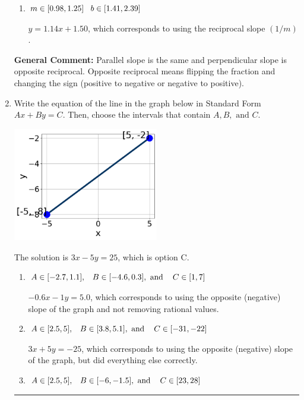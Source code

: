 \documentclass{extbook}[14pt]
\newcommand{\litem}[1]{\item #1

\rule{\textwidth}{0.4pt}}
\begin{document}
\begin{enumerate}
{\begin{enumerate}[label=\Alph*.]
 $y = 0.88x + 1.00$, which corresponds to correct slope and mis-distributing while simplifying to slope-intercept form.
\item \( m \in [0.98, 1.25] \hspace*{3mm} b \in [1.41, 2.39] \)

 $y = 1.14x + 1.50$, which corresponds to using the reciprocal slope $(1/m)$.
\end{enumerate}

\textbf{General Comment:} Parallel slope is the same and perpendicular slope is opposite reciprocal. Opposite reciprocal means flipping the fraction and changing the sign (positive to negative or negative to positive).
}
\litem{
Write the equation of the line in the graph below in Standard Form $Ax+By=C$. Then, choose the intervals that contain $A, B, \text{ and } C$.

\begin{center}
    \includegraphics[width=0.5\textwidth]{../Figures/linearGraphToStandardA.png}
\end{center}


The solution is \( 3x - 5y = 25 \), which is option C.\begin{enumerate}[label=\Alph*.]
\item \( A \in [-2.7, 1.1], \hspace{3mm} B \in [-4.6, 0.3], \text{ and } \hspace{3mm} C \in [1, 7] \)

 $-0.6x - 1y = 5.0$, which corresponds to using the opposite (negative) slope of the graph and not removing rational values.
\item \( A \in [2.5, 5], \hspace{3mm} B \in [3.8, 5.1], \text{ and } \hspace{3mm} C \in [-31, -22] \)

 $3x + 5y = -25$, which corresponds to using the opposite (negative) slope of the graph, but did everything else correctly.
\item \( A \in [2.5, 5], \hspace{3mm} B \in [-6, -1.5], \text{ and } \hspace{3mm} C \in [23, 28] \)


\end{enumerate}}
\end{enumerate}
\end{document}
